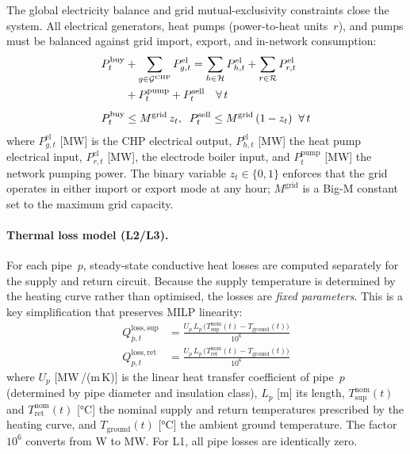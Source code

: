 \documentclass[a4paper,fleqn]{cas-dc}
\begin{document}
The global electricity balance and grid mutual-exclusivity
constraints close the system. All electrical generators, heat
pumps (power-to-heat units~$r$), and pumps must be balanced
against grid import, export, and in-network consumption:
%
\begin{align}
  P_t^{\mathrm{buy}}
    &+ \sum_{g \in \mathcal{G}^{\mathrm{CHP}}} P_{g,t}^{\mathrm{el}}
  = \sum_{h \in \mathcal{H}} P_{h,t}^{\mathrm{el}}
    + \sum_{r \in \mathcal{R}} P_{r,t}^{\mathrm{el}} \notag \\
    &+ P_t^{\mathrm{pump}} + P_t^{\mathrm{sell}}
  \quad \forall\, t
  \label{eq:balance_el} \\[4pt]
  P_t^{\mathrm{buy}} &\leq M^{\mathrm{grid}}\, z_t,
  \;\;
  P_t^{\mathrm{sell}} \leq M^{\mathrm{grid}}\, (1 - z_t)
  \;\; \forall\, t
  \label{eq:grid_bigm}
\end{align}
%
where $P_{g,t}^{\mathrm{el}}$ [MW] is the CHP electrical output,
$P_{h,t}^{\mathrm{el}}$ [MW] the heat pump electrical input,
$P_{r,t}^{\mathrm{el}}$ [MW], the electrode boiler input, and
$P_t^{\mathrm{pump}}$ [MW] the network pumping power.
The binary variable $z_t \in \{0,1\}$ enforces that the grid
operates in either import or export mode at any hour;
$M^{\mathrm{grid}}$ is a Big-M constant set to the maximum
grid capacity.

\paragraph{Thermal loss model (L2/L3).}
\label{sec:model_losses}
For each pipe~$p$, steady-state conductive heat losses are computed
separately for the supply and return circuit. Because the supply
temperature is determined by the heating curve rather than
optimised, the losses are \emph{fixed parameters}. This is a key
simplification that preserves MILP linearity:
%
\begin{align}
  Q_{p,t}^{\mathrm{loss,sup}} &= \frac{U_p\, L_p\,
    \bigl(T_{\mathrm{sup}}^{\mathrm{nom}}(t)
    - T_{\mathrm{ground}}(t)\bigr)}{10^6}
  \label{eq:loss_supply} \\[4pt]
  Q_{p,t}^{\mathrm{loss,ret}} &= \frac{U_p\, L_p\,
    \bigl(T_{\mathrm{ret}}^{\mathrm{nom}}(t)
    - T_{\mathrm{ground}}(t)\bigr)}{10^6}
  \label{eq:loss_return}
\end{align}
%
where $U_p$ [MW\,/(m\,K)] is the linear heat transfer
coefficient of pipe~$p$ (determined by pipe diameter and insulation
class), $L_p$ [m] its length, $T_{\mathrm{sup}}^{\mathrm{nom}}(t)$
and $T_{\mathrm{ret}}^{\mathrm{nom}}(t)$ [\si{\celsius}] the nominal
supply and return temperatures prescribed by the heating curve, and
$T_{\mathrm{ground}}(t)$ [\si{\celsius}] the ambient ground
temperature. The factor $10^6$ converts from W to MW. For L1,
all pipe losses are identically zero.
\end{document}

